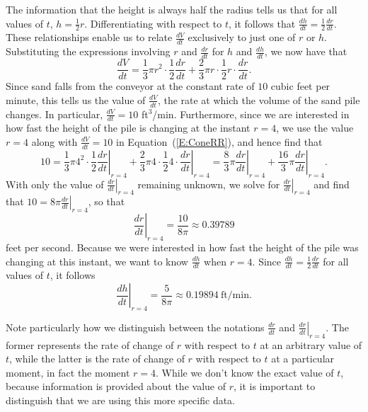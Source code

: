 The information that the height is always half the radius tells us that for all values of $t$, $h = \frac{1}{2}r$.  Differentiating with respect to $t$, it follows that $\frac{dh}{dt} = \frac{1}{2} \frac{dr}{dt}$.  These relationships enable us to relate $\frac{dV}{dt}$ exclusively to just one of $r$ or $h$.  Substituting the expressions involving $r$ and $\frac{dr}{dt}$ for $h$ and $\frac{dh}{dt}$, we now have that 
\begin{equation} \label{E:ConeRR}
\frac{dV}{dt} = \frac{1}{3} \pi r^2 \cdot \frac{1}{2} \frac{dr}{dt} + \frac{2}{3} \pi r \cdot \frac{1}{2}r \cdot \frac{dr}{dt}.
\end{equation}
Since sand falls from the conveyor at the constant rate of $10$ cubic feet per minute, this tells us the value of $\frac{dV}{dt}$, the rate at which the volume of the sand pile changes.  In particular, $\frac{dV}{dt} = 10$ ft$^3$/min.  Furthermore, since we are interested in how fast the height of the pile is changing at the instant $r = 4$, we use the value $r = 4$ along with $\frac{dV}{dt} = 10$ in Equation~(\ref{E:ConeRR}), and hence find that \small
$$10 = \frac{1}{3} \pi 4^2 \cdot \frac{1}{2}  \left. \frac{dr}{dt} \right|_{r=4} + \frac{2}{3} \pi 4 \cdot \frac{1}{2}4 \cdot \left. \frac{dr}{dt} \right|_{r=4} = \frac{8}{3}\pi \left. \frac{dr}{dt} \right|_{r=4} + \frac{16}{3} \pi \left. \frac{dr}{dt} \right|_{r=4}.$$ \normalsize
With only the value of $\left. \frac{dr}{dt} \right|_{r=4}$ remaining unknown, we solve for $\left. \frac{dr}{dt} \right|_{r=4}$ and find that $10 = 8 \pi \left. \frac{dr}{dt} \right|_{r=4}$, so that
$$\left. \frac{dr}{dt} \right|_{r=4} = \frac{10}{8\pi} \approx 0.39789$$
feet per second.  Because we were interested in how fast the height of the pile was changing at this instant, we want to know $\frac{dh}{dt}$ when $r = 4$.  Since $\frac{dh}{dt} = \frac{1}{2} \frac{dr}{dt}$ for all values of $t$, it follows 
$$\left. \frac{dh}{dt} \right|_{r=4} = \frac{5}{8\pi} \approx 0.19894 \ \mbox{ft/min}.$$

Note particularly how we distinguish between the notations $\frac{dr}{dt}$ and $\left. \frac{dr}{dt} \right|_{r=4}$.  The former represents the rate of change of $r$ with respect to $t$ at an arbitrary value of $t$, while the latter is the rate of change of $r$ with respect to $t$ at a particular moment, in fact the moment $r = 4$.  While we don't know the exact value of $t$, because information is provided about the value of $r$, it is important to distinguish that we are using this more specific data.

